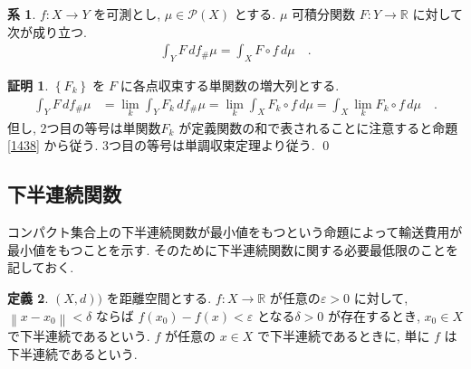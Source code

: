 \documentclass[10pt, fleqn, label-section=none, titlepage]{bxjsarticle}
\theoremstyle{definition}
\newtheorem{dfn}{定義}[section]
\newtheorem{cor}[dfn]{系}
\newtheorem*{pf*}{証明}
\newcommand{\veps}{\varepsilon}
\newcommand{\norm}[1]{\left\|#1\right\|}
\renewcommand{\;}{\, ; \,}
\renewcommand{\d}{\, {d}}
\begin{document}
\begin{cor}
$f: X \rightarrow Y  $ を可測とし, $\mu \in \mathcal{P}(X)$ とする. $\mu$ 可積分関数 $F : Y \rightarrow \mathbb{R} $ に対して次が成り立つ.
\begin{align*}
\int_{Y} F \d f_{\#}\mu = \int_{X} F \circ f \d\mu \quad .
\end{align*}
\end{cor}

\begin{pf*}
$ \left\{ F_k \right\} \mathop{を}F\mathop{に各点収束する単関数の増大列とする.}$
\begin{align*}
\int_{Y} F \d f_{\#}\mu &= \lim_{k} \int_{Y} F_{k} \d f_{\#}\mu 
= \lim_{k} \int_{X} F_{k} \circ f \d\mu 
= \int_{X} \lim_{k} F_{k} \circ f \d\mu \quad. 
\end{align*}
但し, 2つ目の等号は単関数$F_k$ が定義関数の和で表されることに注意すると命題\ref{1438} から従う. 3つ目の等号は単調収束定理より従う.
\qed
\end{pf*}


\subsection{下半連続関数}

コンパクト集合上の下半連続関数が最小値をもつという命題によって輸送費用が最小値をもつことを示す. そのために下半連続関数に関する必要最低限のことを記しておく.

\begin{dfn}
$(X,d))$ を距離空間とする. $f:X\rightarrow \mathbb{R}$ が任意の$\veps > 0$ に対して, $\norm{x - x_0} < \delta$ ならば $f(x_0) - f(x) < \veps$ となる$\delta > 0$ が存在するとき, $x_0 \in X$ で下半連続であるという. $f$ が任意の $x \in X$ で下半連続であるときに, 単に $f$ は下半連続であるという.
\end{dfn}
\end{document}
